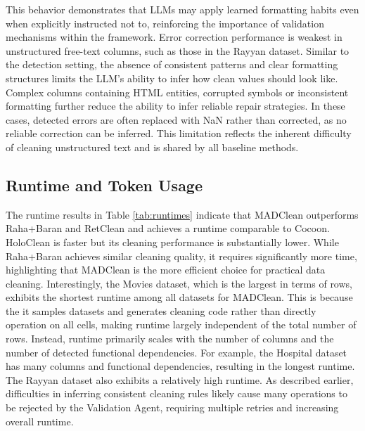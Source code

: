 This behavior demonstrates that LLMs may apply learned formatting habits even when explicitly instructed not to, reinforcing the importance of validation mechanisms within the framework.
\newline\newline
Error correction performance is weakest in unstructured free-text columns, such as those in the Rayyan dataset. 
Similar to the detection setting, the absence of consistent patterns and clear formatting structures limits the LLM's ability to infer how clean values should look like.
Complex columns containing HTML entities, corrupted symbols or inconsistent formatting further reduce the ability to infer reliable repair strategies. 
In these cases, detected errors are often replaced with NaN rather than corrected, as no reliable correction can be inferred. 
This limitation reflects the inherent difficulty of cleaning unstructured text and is shared by all baseline methods.

\subsection{Runtime and Token Usage}
The runtime results in Table \ref{tab:runtimes} indicate that MADClean outperforms Raha+Baran and RetClean and achieves a runtime comparable to Cocoon. 
HoloClean is faster but its cleaning performance is substantially lower. 
While Raha+Baran achieves similar cleaning quality, it requires significantly more time, highlighting that MADClean is the more efficient choice for practical data cleaning.
Interestingly, the Movies dataset, which is the largest in terms of rows, exhibits the shortest runtime among all datasets for MADClean. 
This is because the it samples datasets and generates cleaning code rather than directly operation on all cells, making runtime largely independent of the total number of rows. 
Instead, runtime primarily scales with the number of columns and the number of detected functional dependencies. 
For example, the Hospital dataset has many columns and functional dependencies, resulting in the longest runtime.
The Rayyan dataset also exhibits a relatively high runtime. 
As described earlier, difficulties in inferring consistent cleaning rules likely cause many operations to be rejected by the Validation Agent, requiring multiple retries and increasing overall runtime.

